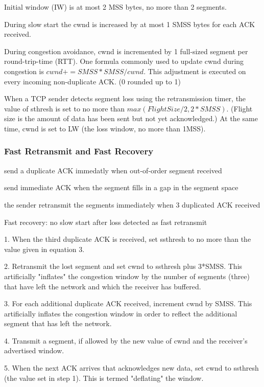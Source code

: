 Initial window (IW) is at most 2 MSS bytes, no more than 2 segments. 

During slow start the cwnd is increased by at most 1 SMSS bytes for each ACK received.

During congestion avoidance, cwnd is incremented by 1 full-sized segment
per round-trip-time (RTT). One formula commonly used to update cwnd during
congestion is $ cwnd += SMSS*SMSS/cwnd $. This adjustment is executed on every
incoming non-duplicate ACK. (0 rounded up to 1)

When a TCP sender detects segment loss using the retransmission timer,
the value of sthresh is set to no more than $ max(FlightSize/2, 2*SMSS) $.
(Flight size is the amount of data has been sent but not yet acknowledged.)
At the same time, cwnd is set to LW (the loss window, no more than 1MSS).

\subsubsection*{Fast Retransmit and Fast Recovery}

send a duplicate ACK immedatly when out-of-order segment received

send immediate ACK when the segment fills in a gap in the segment space

the sender retransmit the segments immediately when 3 duplicated ACK received

Fast recovery: no slow start after loss detected as fast retransmit

   1.  When the third duplicate ACK is received, set ssthresh to no more
       than the value given in equation 3.

   2.  Retransmit the lost segment and set cwnd to ssthresh plus 3*SMSS.
       This artificially "inflates" the congestion window by the number
       of segments (three) that have left the network and which the
       receiver has buffered.

   3.  For each additional duplicate ACK received, increment cwnd by
       SMSS.  This artificially inflates the congestion window in order
       to reflect the additional segment that has left the network.

   4.  Transmit a segment, if allowed by the new value of cwnd and the
       receiver's advertised window.

   5.  When the next ACK arrives that acknowledges new data, set cwnd to
       ssthresh (the value set in step 1).  This is termed "deflating"
       the window.

